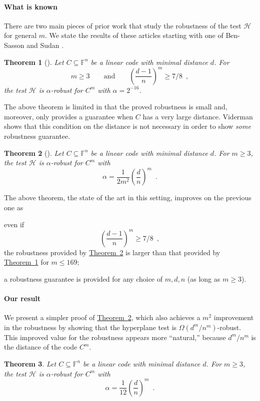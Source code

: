 \documentclass[11pt]{article}
\numberwithin{equation}{section}
\newtheorem{theorem}{Theorem}[section]
\theoremstyle{definition}
\theoremstyle{plain}
\newcommand{\expref}[2]{\hyperref[#2]{#1~\ref{#2}}}
\theoremstyle{plain}
\newtheorem{ftheorem}[theorem]{Theorem}
\newcommand{\colored}{}
\newcommand{\tester}{\colored{\mathcal H}} %
\newcommand{\codedist}{\colored{d}} %
\newcommand{\blocklength}{\colored{n}} %
\newcommand{\Field}{\colored{\mathbb F}}
\newcommand{\parhead}{\paragraph}
\begin{document}
\parhead{What is known}
There are two main
%
pieces of prior work  %
that study the robustness of the test $\tester$ for general $m$.
We state the results of these
%
articles  %
starting with one of Ben-Sasson and Sudan \cite{Ben-SassonS06}.

\begin{theorem}[\cite{Ben-SassonS06}]
\label{thm:bs}
Let $C \subseteq \Field^n$ be a linear code with minimal distance $d$.
For
\[
  m \geq 3\qquad\text{and}\qquad \left(\frac{\codedist-1}{\blocklength}\right)^m \geq 7/8\enspace,
\]
the test $\tester$ is $\alpha$-robust for $C^m$ with $\alpha = 2^{-16}$.
\end{theorem}

\noindent
The above theorem is limited in that the proved robustness is small and, moreover, only provides a guarantee when $C$ has a very large distance. Viderman \cite{Viderman12} shows that this condition on the distance is not necessary in order to show \emph{some} robustness guarantee.

\begin{theorem}[\cite{Viderman12}]
\label{thm:vid}
Let $C \subseteq \Field^n$ be a linear code with minimal distance $d$.
For $m \geq 3$, the test $\tester$ is $\alpha$-robust %
for   %
$C^m$ with
\[
  \alpha = \frac{1}{2 m^2} \left(\frac{\codedist}{\blocklength}\right)^m\enspace.
\]
\end{theorem}

\noindent
The above theorem, the state of the art in this setting, improves on the previous one as
\begin{inparaenum}[(i)]
\item even if
  \[
    \left(\frac{\codedist-1}{\blocklength}\right)^{m} \geq 7/8\enspace,
  \]
  the robustness provided by \expref{Theorem}{thm:vid} is larger than
  that provided by \expref{Theorem}{thm:bs} for $m \leq 169$;
  \item a robustness guarantee is provided for any choice of $m,\codedist,\blocklength$ (as long as $m \geq 3$).
\end{inparaenum}

\parhead{Our result}
We present a simpler proof of \expref{Theorem}{thm:vid}, which also achieves a $m^2$ improvement in the robustness by showing that the hyperplane test is $\Omega({\codedist^m}/{\blocklength^m})$-robust. This improved value for the robustness appears more ``natural,'' because ${\codedist^m}/{\blocklength^m}$ is the distance of the code $C^m$.

\begin{ftheorem}
\label{thm:pat-robustness}
Let $C \subseteq \Field^n$ be a linear code with minimal distance $d$.
For $m \geq 3$, the test $\tester$ is $\alpha$-robust for $C^m$ with
\[
  \alpha = \frac{1}{12} \left(\frac{\codedist}{\blocklength}\right)^m\enspace.
\]
\end{ftheorem}
\end{document}
